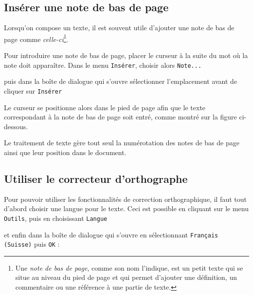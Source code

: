 \subsection{Insérer une note de bas de page}\label{Texte2NoteBasPage}

Lorsqu'on compose un texte, il est souvent utile d'ajouter une note de bas de page comme \emph{celle-ci}\footnote{Une \emph{note de bas de page}, comme son nom l'indique, est un petit texte qui se situe au niveau du pied de page et qui permet d'ajouter une définition, un commentaire ou une référence à une partie de texte.}.

Pour introduire une note de bas de page, placer le curseur à la suite du mot où la note doit apparaître. Dans le menu \texttt{Insérer}, choisir alors \texttt{Note...}


puis dans la boîte de dialogue qui s'ouvre sélectionner l'emplacement avant de cliquer sur \texttt{Insérer}


Le curseur se positionne alors dans le pied de page afin que le texte correspondant à la note de bas de page soit entré, comme montré sur la figure ci-dessous.


Le traitement de texte gère tout seul la numérotation des notes de bas de page ainsi que leur position dans le document.




\subsection{Utiliser le correcteur d'orthographe}\label{Texte2CorrecteurOrtho}

Pour pouvoir utiliser les fonctionnalités de correction orthographique, il faut tout d'abord choisir une langue pour le texte. Ceci est possible en cliquant sur le menu \texttt{Outils}, puis en choisissant \texttt{Langue} 


et enfin dans la boîte de dialogue qui s'ouvre en sélectionnant \texttt{Français (Suisse)} puis \texttt{OK} :

